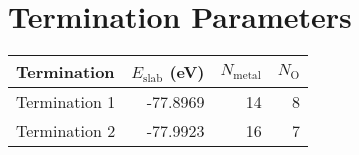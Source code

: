 \documentclass{article}
\begin{document}
\section*{Termination Parameters}
\begin{tabular}{lrrr}
\hline
 Termination   &   $E_{\mathrm{slab}}$ (eV) &   $N_{\mathrm{metal}}$ &   $N_\mathrm{O}$ \\
\hline
 Termination 1 &                   -77.8969 &                     14 &                8 \\
 Termination 2 &                   -77.9923 &                     16 &                7 \\
\hline
\end{tabular}
\end{document}
